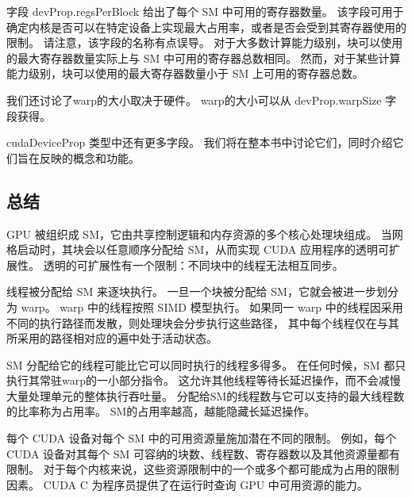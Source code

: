 字段 devProp.regsPerBlock 给出了每个 SM 中可用的寄存器数量。 
该字段可用于确定内核是否可以在特定设备上实现最大占用率，或者是否会受到其寄存器使用的限制。 
请注意，该字段的名称有点误导。 对于大多数计算能力级别，块可以使用的最大寄存器数量实际上与 SM 中可用的寄存器总数相同。 
然而，对于某些计算能力级别，块可以使用的最大寄存器数量小于 SM 上可用的寄存器总数。

我们还讨论了warp的大小取决于硬件。 warp的大小可以从 devProp.warpSize 字段获得。

cudaDeviceProp 类型中还有更多字段。 我们将在整本书中讨论它们，同时介绍它们旨在反映的概念和功能。

\subsection{总结}
GPU 被组织成 SM，它由共享控制逻辑和内存资源的多个核心处理块组成。 
当网格启动时，其块会以任意顺序分配给 SM，从而实现 CUDA 应用程序的透明可扩展性。 
透明的可扩展性有一个限制：不同块中的线程无法相互同步。

线程被分配给 SM 来逐块执行。 一旦一个块被分配给 SM，它就会被进一步划分为 warp。 
warp 中的线程按照 SIMD 模型执行。 如果同一 warp 中的线程因采用不同的执行路径而发散，则处理块会分步执行这些路径，
其中每个线程仅在与其所采用的路径相对应的遍中处于活动状态。

SM 分配给它的线程可能比它可以同时执行的线程多得多。 在任何时候，SM 都只执行其常驻warp的一小部分指令。 
这允许其他线程等待长延迟操作，而不会减慢大量处理单元的整体执行吞吐量。 
分配给SM的线程数与它可以支持的最大线程数的比率称为占用率。 SM的占用率越高，越能隐藏长延迟操作。

每个 CUDA 设备对每个 SM 中的可用资源量施加潜在不同的限制。 
例如，每个 CUDA 设备对其每个 SM 可容纳的块数、线程数、寄存器数以及其他资源量都有限制。 
对于每个内核来说，这些资源限制中的一个或多个都可能成为占用的限制因素。 
CUDA C 为程序员提供了在运行时查询 GPU 中可用资源的能力。